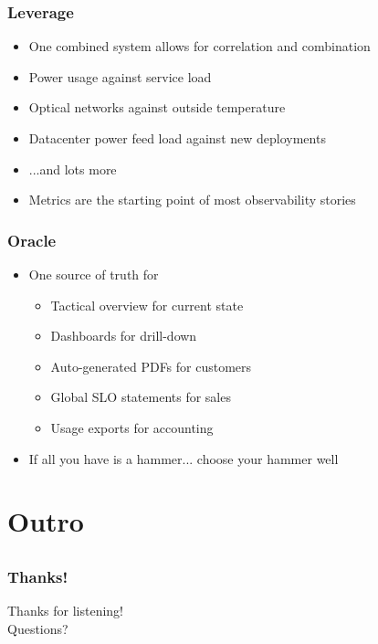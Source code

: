 \documentclass[t]{beamer}
\begin{document}
\begin{frame}
	\frametitle{Leverage}
	\begin{itemize}
		\item One combined system allows for correlation and combination
		\item Power usage against service load
		\item Optical networks against outside temperature
		\item Datacenter power feed load against new deployments
		\item ...and lots more
		\item Metrics are the starting point of most observability stories
	\end{itemize}
\end{frame}

\begin{frame}
	\frametitle{Oracle}
	\begin{itemize}
		\item One source of truth for
		\begin{itemize}
			\item Tactical overview for current state
			\item Dashboards for drill-down
			\item Auto-generated PDFs for customers
			\item Global SLO statements for sales
			\item Usage exports for accounting
		\end{itemize}
	\item If all you have is a hammer... choose your hammer well
	\end{itemize}
\end{frame}








\section{Outro}

\subsection{}

\begin{frame}
	\frametitle{Thanks!}
		\begin{center}
			\vfill
			Thanks for listening!\\
			\vfill
			Questions?
			\vfill
		\end{center}
\end{frame}
\end{document}
